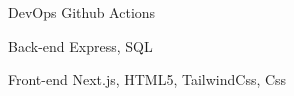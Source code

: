 \newpage
{}


\begin{cvskills}

  \cvskill
    {DevOps} %
    {Github Actions} %

  \cvskill
    {Back-end} %
    {Express, SQL} %

  \cvskill
    {Front-end} %
    {Next.js, HTML5, TailwindCss, Css} %

\end{cvskills}
